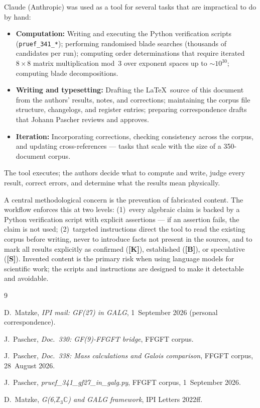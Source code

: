 Claude (Anthropic) was used as a tool for several tasks that are
impractical to do by hand:
\begin{itemize}
  \item \textbf{Computation:} Writing and executing the Python verification
    scripts (\texttt{pruef\_341\_*}); performing randomised blade searches
    (thousands of candidates per run); computing order determinations that
    require iterated $8\times8$ matrix multiplication mod~3 over exponent
    spaces up to $\sim10^{30}$; computing blade decompositions.
  \item \textbf{Writing and typesetting:} Drafting the \LaTeX\ source of
    this document from the authors' results, notes, and corrections;
    maintaining the corpus file structure, changelogs, and register entries;
    preparing correspondence drafts that Johann Pascher reviews and approves.
  \item \textbf{Iteration:} Incorporating corrections, checking consistency
    across the corpus, and updating cross-references --- tasks that scale
    with the size of a 350-document corpus.
\end{itemize}
The tool executes; the authors decide what to compute and write, judge
every result, correct errors, and determine what the results mean physically.

A central methodological concern is the prevention of fabricated content.
The workflow enforces this at two levels: (1)~every algebraic claim is
backed by a Python verification script with explicit assertions ---
if an assertion fails, the claim is not used; (2)~targeted instructions
direct the tool to read the existing corpus before writing, never to
introduce facts not present in the sources, and to mark all results
explicitly as confirmed (\textbf{[K]}), established (\textbf{[B]}), or
speculative (\textbf{[S]}). Invented content is the primary risk when
using language models for scientific work; the scripts and instructions
are designed to make it detectable and avoidable.

\begin{thebibliography}{9}

D.~Matzke,
\textit{IPI mail: GF(27) in GALG},
1~September 2026 (personal correspondence).

J.~Pascher,
\textit{Doc.~330: GF(9)-FFGFT bridge},
FFGFT corpus.

J.~Pascher,
\textit{Doc.~338: Mass calculations and Galois comparison},
FFGFT corpus, 28~August 2026.

J.~Pascher,
\textit{pruef\_341\_gf27\_in\_galg.py},
FFGFT corpus, 1~September 2026.

D.~Matzke,
\textit{G(6,$\mathbb{Z}_3\mathbb{C}$) and GALG framework},
IPI Letters 2022ff.

\end{thebibliography}
